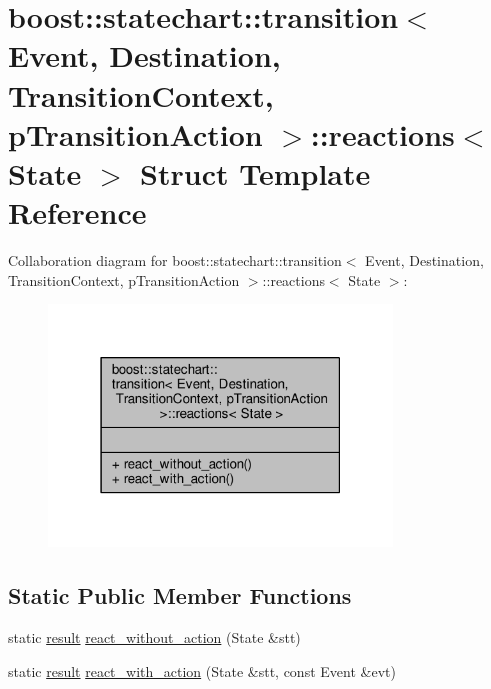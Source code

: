 \hypertarget{structboost_1_1statechart_1_1transition_1_1reactions}{}\section{boost\+:\+:statechart\+:\+:transition$<$ Event, Destination, Transition\+Context, p\+Transition\+Action $>$\+:\+:reactions$<$ State $>$ Struct Template Reference}
\label{structboost_1_1statechart_1_1transition_1_1reactions}


Collaboration diagram for boost\+:\+:statechart\+:\+:transition$<$ Event, Destination, Transition\+Context, p\+Transition\+Action $>$\+:\+:reactions$<$ State $>$\+:
\nopagebreak
\begin{figure}[H]
\begin{center}
\leavevmode
\includegraphics[width=259pt]{structboost_1_1statechart_1_1transition_1_1reactions__coll__graph}
\end{center}
\end{figure}
\subsection*{Static Public Member Functions}
\begin{DoxyCompactItemize}
\item 
static \mbox{\hyperlink{namespaceboost_1_1statechart_abe807f6598b614d6d87bb951ecd92331}{result}} \mbox{\hyperlink{structboost_1_1statechart_1_1transition_1_1reactions_a545ce845f5aea7cbd44dc4740e05b536}{react\+\_\+without\+\_\+action}} (State \&stt)
\item 
static \mbox{\hyperlink{namespaceboost_1_1statechart_abe807f6598b614d6d87bb951ecd92331}{result}} \mbox{\hyperlink{structboost_1_1statechart_1_1transition_1_1reactions_a82b553b236c3003abfea39e2aaf4d179}{react\+\_\+with\+\_\+action}} (State \&stt, const Event \&evt)
\end{DoxyCompactItemize}



